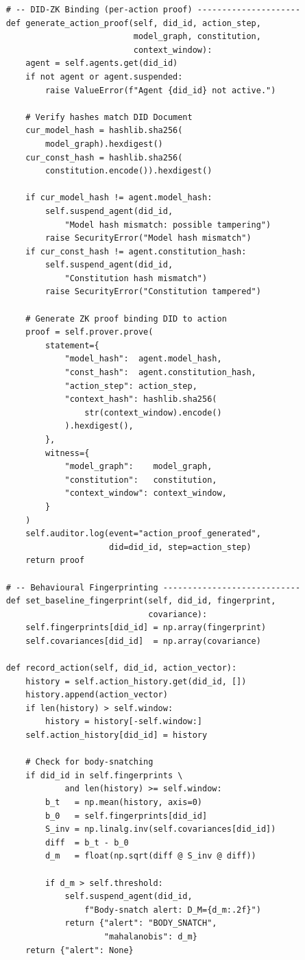\begin{lstlisting}
    # -- DID-ZK Binding (per-action proof) ---------------------
    def generate_action_proof(self, did_id, action_step,
                              model_graph, constitution,
                              context_window):
        agent = self.agents.get(did_id)
        if not agent or agent.suspended:
            raise ValueError(f"Agent {did_id} not active.")

        # Verify hashes match DID Document
        cur_model_hash = hashlib.sha256(
            model_graph).hexdigest()
        cur_const_hash = hashlib.sha256(
            constitution.encode()).hexdigest()

        if cur_model_hash != agent.model_hash:
            self.suspend_agent(did_id,
                "Model hash mismatch: possible tampering")
            raise SecurityError("Model hash mismatch")
        if cur_const_hash != agent.constitution_hash:
            self.suspend_agent(did_id,
                "Constitution hash mismatch")
            raise SecurityError("Constitution tampered")

        # Generate ZK proof binding DID to action
        proof = self.prover.prove(
            statement={
                "model_hash":  agent.model_hash,
                "const_hash":  agent.constitution_hash,
                "action_step": action_step,
                "context_hash": hashlib.sha256(
                    str(context_window).encode()
                ).hexdigest(),
            },
            witness={
                "model_graph":    model_graph,
                "constitution":   constitution,
                "context_window": context_window,
            }
        )
        self.auditor.log(event="action_proof_generated",
                         did=did_id, step=action_step)
        return proof

    # -- Behavioural Fingerprinting ----------------------------
    def set_baseline_fingerprint(self, did_id, fingerprint,
                                 covariance):
        self.fingerprints[did_id] = np.array(fingerprint)
        self.covariances[did_id]  = np.array(covariance)

    def record_action(self, did_id, action_vector):
        history = self.action_history.get(did_id, [])
        history.append(action_vector)
        if len(history) > self.window:
            history = history[-self.window:]
        self.action_history[did_id] = history

        # Check for body-snatching
        if did_id in self.fingerprints \
                and len(history) >= self.window:
            b_t   = np.mean(history, axis=0)
            b_0   = self.fingerprints[did_id]
            S_inv = np.linalg.inv(self.covariances[did_id])
            diff  = b_t - b_0
            d_m   = float(np.sqrt(diff @ S_inv @ diff))

            if d_m > self.threshold:
                self.suspend_agent(did_id,
                    f"Body-snatch alert: D_M={d_m:.2f}")
                return {"alert": "BODY_SNATCH",
                        "mahalanobis": d_m}
        return {"alert": None}
\end{lstlisting}


